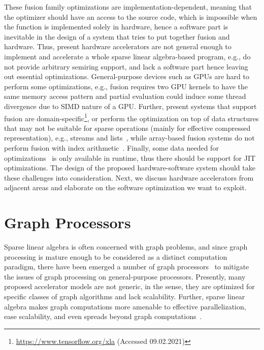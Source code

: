 \documentclass[10pt,conference]{IEEEtran}
\begin{document}
These fusion family optimizations are implementation-dependent, meaning that the optimizer should have an access to the source code, which is impossible when the function is implemented solely in hardware, hence a software part is inevitable in the design of a system that tries to put together fusion and hardware.
Thus, present hardware accelerators are not general enough to implement and accelerate a whole sparse linear algebra-based program, e.g., do not provide arbitrary semiring support, and lack a software part hence leaving out essential optimizations.
General-purpose devices such as GPUs are hard to perform some optimizations, e.g., fusion requires two GPU kernels to have the same memory access pattern and partial evaluation could induce some thread divergence due to SIMD nature of a GPU. 
Further, present systems that support fusion are domain-specific\footnote{\url{https://www.tensorflow.org/xla} (Accessed 09.02.2021)}, or perform the optimization on top of data structures that may not be suitable for sparse operations (mainly for effective compressed representation), e.g., streams and lists~\cite{StreamFusion,StreamFusion2}, while array-based fusion systems do not perform fusion with index arithmetic~\cite{Futhark}.
Finally, some data needed for optimizations~\cite{jones} is only available in runtime, thus there should be support for JIT optimizations.
The design of the proposed hardware-software system should take these challenges into consideration. 
Next, we discuss hardware accelerators from adjacent areas and elaborate on the software optimization we want to exploit.

\section{Graph Processors}

Sparse linear algebra is often concerned with graph problems, and since
graph processing is mature enough to be considered as a distinct computation paradigm, there have been emerged a number of graph processors~\cite{GraphProcessors} to mitigate the issues of graph processing on general-purpose processors.
Presently, many proposed accelerator models are not generic, in the sense, they are optimized for specific
classes of graph algorithms and lack scalability. Further, sparse linear algebra makes graph computations more amenable to effective parallelization, ease scalability, and even spreads beyond graph computations~\cite{compBio}. 
\end{document}
